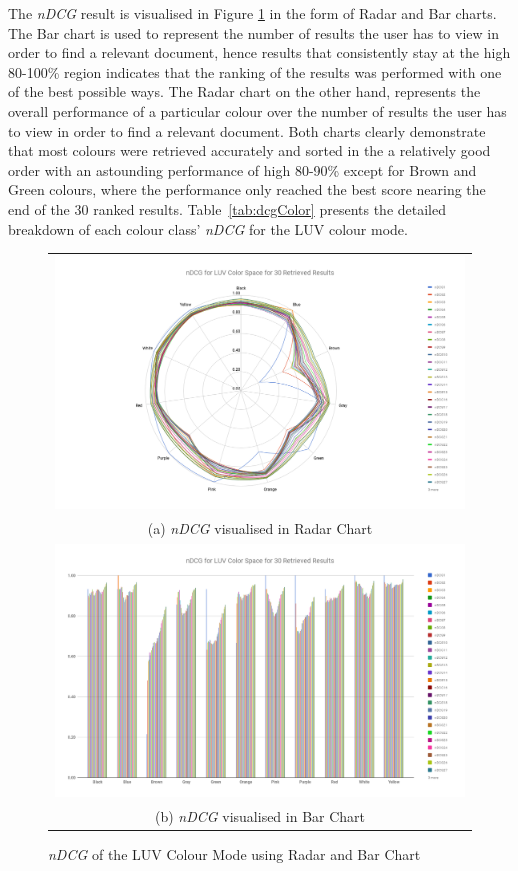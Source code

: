 The \textit{nDCG} result is visualised in Figure \ref{fig:colorndcg} in the form of Radar and Bar charts. The Bar chart is used to represent the number of results the user has to view in order to find a relevant document, hence results that consistently stay at the high 80-100\% region indicates that the ranking of the results was performed with one of the best possible ways. The Radar chart on the other hand, represents the overall performance of a particular colour over the number of results the user has to view in order to find a relevant document. Both charts clearly demonstrate that most colours were retrieved accurately and sorted in the a relatively good order with an astounding performance of high 80-90\% except for Brown and Green colours, where the performance only reached the best score nearing the end of the 30 ranked results. Table~\ref{tab:dcgColor} presents the detailed breakdown of each colour class' \textit{nDCG} for the LUV colour mode.
\begin{figure}[tb!]
  \centering
  \begin{tabular}{c}
    \includegraphics[width=0.9\linewidth]{image/retrievalTwo/radar_ndcg_luv.png}\\
    (a) \textit{nDCG} visualised in Radar Chart \\
    \includegraphics[width=0.9\linewidth]{image/retrievalTwo/bar_ndcg_luv.png}\\
    (b) \textit{nDCG} visualised in Bar Chart \\
  \end{tabular}
  \caption{\textit{nDCG} of the LUV Colour Mode using Radar and Bar Chart}
  \label{fig:colorndcg}
\end{figure}

